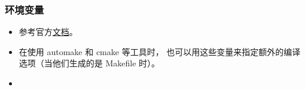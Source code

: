 \subsubsection{环境变量}
\begin{itemize}
\item 参考官方\href{https://www.gnu.org/software/make/manual/html_node/Implicit-Variables.html}{文档}。
\item 在使用 automake 和 cmake 等工具时， 也可以用这些变量来指定额外的编译选项（当他们生成的是 Makefile 时）。
\item 
\end{itemize}
